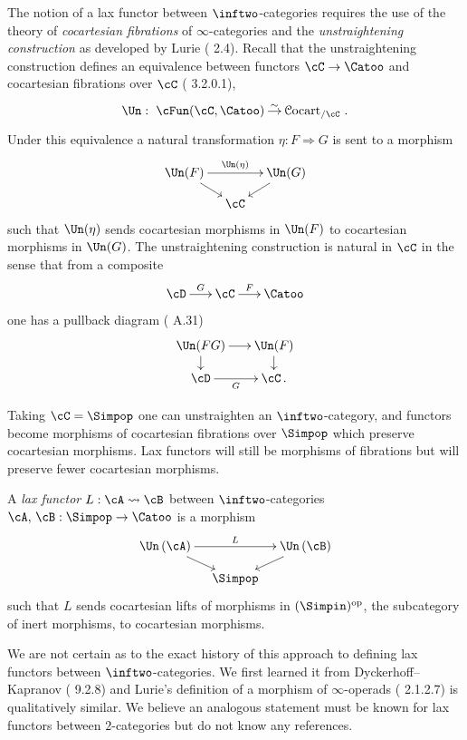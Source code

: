 \documentclass[a4paper]{article}
\numberwithin{equation}{section}
\begin{document}
The notion of a lax functor between $\inftwo$-categories requires the use of the theory of {\em cocartesian fibrations} of $\infty$-categories and the {\em unstraightening construction} as developed by Lurie (\cite{HTT} 2.4). Recall that the unstraightening construction defines an equivalence between functors $\cC \to \Catoo$ and cocartesian fibrations over $\cC$ (\cite{HTT} 3.2.0.1),
\begin{equation*}
\Un: \xymatrixcolsep{.8pc}\xymatrix{\cFun(\cC, \Catoo) \ar[r]^-\sim & {\cal C}{\rm ocart}_{/\cC}}.
\end{equation*}
Under this equivalence a natural transformation $\eta:F \Rightarrow G$ is sent to a morphism
\begin{equation*}
 \xymatrixrowsep{.8pc}\xymatrixcolsep{.9pc}\xymatrix{\Un(F)\ar[rr]^{\Un(\eta)} \ar[rd] & & \Un(G) \ar[ld] \\
  & \cC & }
\end{equation*}
such that $\Un(\eta)$ sends cocartesian morphisms in $\Un(F)$ to cocartesian morphisms in $\Un(G)$. The unstraightening construction is natural in $\cC$ in the sense that from a composite
\begin{equation*}
 \xymatrixcolsep{1.4pc} \xymatrix{ \cD \ar[r]^-G & \cC \ar[r]^-F & \Catoo}
\end{equation*}
one has a pullback diagram (\cite{GHN} A.31)
\begin{equation*}
 \xymatrixrowsep{.9pc} \xymatrixcolsep{1.4pc} \xymatrix{ \Un(FG) \ar[d] \ar[r] & \Un(F) \ar[d] \\
 \cD \ar[r]_-{G} & \cC\,. }
\end{equation*}

Taking $\cC=\Simpop$ one can unstraighten an $\inftwo$-category, and functors become morphisms of cocartesian fibrations over $\Simpop$ which preserve cocartesian morphisms. Lax functors will still be morphisms of fibrations but will preserve fewer cocartesian morphisms. 
\begin{defn}
 A {\em lax functor} $L:\cA \rightsquigarrow \cB$ between $\inftwo$-categories $\cA, \, \cB: \Simpop \to \Catoo$ is a morphism
 \begin{equation*}
  \xymatrixrowsep{.8pc}\xymatrixcolsep{.9pc}\xymatrix{\Un\left(\cA\right)\ar[rr]^{L} \ar[rd] & & \Un\left(\cB\right) \ar[ld] \\
  & \Simpop & }
 \end{equation*}
 such that $L$ sends cocartesian lifts of morphisms in $(\Simpin)^{\rm op}$, the subcategory of inert morphisms, to cocartesian morphisms.
\end{defn}
\begin{remark}
We are not certain as to the exact history of this approach to defining lax functors between $\inftwo$-categories. We first learned it from Dyckerhoff--Kapranov (\cite{DK12} 9.2.8) and Lurie's definition of a morphism of $\infty$-operads (\cite{HTT} 2.1.2.7) is qualitatively similar. We believe an analogous statement must be known for lax functors between $2$-categories but do not know any references.
 \end{remark}
 
\end{document}
